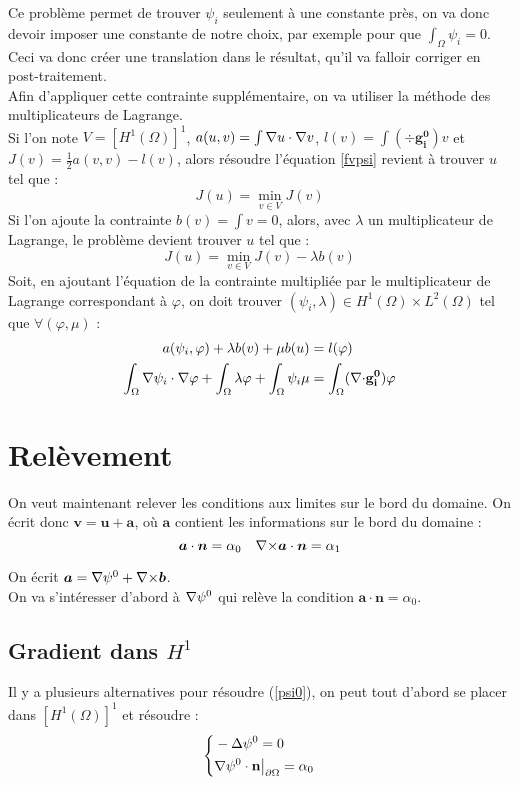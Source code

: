 Ce problème permet de trouver $\psi_i$ seulement à une constante près, on va donc devoir imposer une constante de notre choix, par exemple pour que $\int_\Omega \psi_i = 0$. Ceci va donc créer une translation dans le résultat, qu'il va falloir corriger en post-traitement.\\
Afin d'appliquer cette contrainte supplémentaire, on va utiliser la méthode des multiplicateurs de Lagrange.\\
Si l'on note $V=[H^1(\Omega)]^1$, $a(u,v)=\int {\nabla} u \cdot {\nabla} v$, $l(v)=\int (\div \mathbf{g_i^0})v$ et $J(v)=\frac{1}{2}a(v,v)-l(v)$, alors résoudre l'équation \ref{fvpsi} revient à trouver $u$ tel que :
\[ J(u) = \min_{v\in V} J(v) \]
Si l'on ajoute la contrainte $b(v) = \int v = 0$, alors, avec $\lambda$ un multiplicateur de Lagrange, le problème devient trouver $u$ tel que :
\[ J(u) = \min_{v\in V} J(v) - \lambda b(v) \]
Soit, en ajoutant l'équation de la contrainte multipliée par le multiplicateur de Lagrange correspondant à $\varphi$, on doit trouver $(\psi_i,\lambda)\in H^1(\Omega)\times L^2(\Omega)$ tel que $\forall (\varphi,\mu)$ :
\begin{align}\label{fvpsiml}
a(\psi_i,\varphi) + \lambda b(v) + \mu b(u) &= l(\varphi) \notag \\
\int_\Omega {\nabla}\psi_i\cdot{\nabla}\varphi + \int_\Omega \lambda\varphi + \int_\Omega \psi_i\mu &= \int_\Omega ({\nabla\cdot} \mathbf{g_i^0})\varphi
\end{align}
\section{Relèvement}
\label{relev}
On veut maintenant relever les conditions aux limites sur le bord du domaine. On écrit donc $\bm{v}=\bm{u}+\bm{a}$, où $\bm{a}$ contient les informations sur le bord du domaine :
\[ \bm{a}\cdot\bm{n}=\alpha_0\quad {\nabla\times}\bm{a}\cdot\bm{n}=\alpha_1 \]

On écrit $\bm{a}={\nabla}\psi^0 + {\nabla\times}\bm{b}$.\\
On va s'intéresser d'abord à ${\nabla}\psi^0$ qui relève la condition $\bm{a}\cdot\bm{n}=\alpha_0$.\\

\subsection{Gradient dans $H^1$}
\label{secpsi0hdiv} \label{multLagrange}
Il y a plusieurs alternatives pour résoudre (\ref{psi0}), on peut tout d'abord se placer dans $[H^1(\Omega)]^1$ et résoudre :
\begin{equation}\label{pbpsi0}
\left\{\begin{aligned}
&-{\Delta}\psi^0 = 0\\
&{\nabla}\psi^0\cdot \mathbf{n}{\big\rvert_{\partial\Omega}}=\alpha_0
\end{aligned}\right.
\end{equation}

